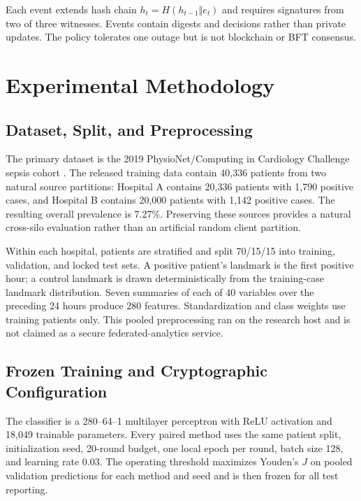 \documentclass[conference]{IEEEtran}
\begin{document}
Each event extends hash chain $h_t=H(h_{t-1}\Vert e_t)$ and requires signatures
from two of three witnesses. Events contain digests and decisions rather than
private updates. The policy tolerates one outage but is not blockchain or BFT
consensus.

\section{Experimental Methodology}
\label{sec:methodology}

\subsection{Dataset, Split, and Preprocessing}

The primary dataset is the 2019 PhysioNet/Computing in Cardiology Challenge
sepsis cohort
\cite{reyna2020early,physionet2019sepsis}. The released training data contain
40,336 patients from two natural source partitions: Hospital A contains 20,336
patients with 1,790 positive cases, and Hospital B contains 20,000 patients with
1,142 positive cases. The resulting overall prevalence is 7.27\%. Preserving
these sources provides a natural cross-silo evaluation rather than an artificial
random client partition.

Within each hospital, patients are stratified and split 70/15/15 into training,
validation, and locked test sets. A positive patient's landmark is the first
positive hour; a control landmark is drawn deterministically from the
training-case landmark distribution. Seven summaries of each of 40 variables
over the preceding 24 hours produce 280 features. Standardization and class
weights use training patients only. This pooled preprocessing ran on the
research host and is not claimed as a secure federated-analytics service.

\subsection{Frozen Training and Cryptographic Configuration}

The classifier is a 280--64--1 multilayer perceptron with ReLU activation and
18,049 trainable parameters. Every paired method uses the same patient split,
initialization seed, 20-round budget, one local epoch per round, batch size 128,
and learning rate 0.03. The operating threshold maximizes Youden's $J$ on pooled
validation predictions for each method and seed and is then frozen for all test
reporting.
\end{document}
